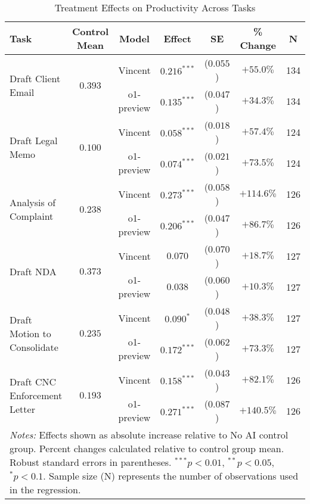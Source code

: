 \begin{table}[!htbp]
\centering
\caption{Treatment Effects on Productivity Across Tasks}
\label{tab:productivity_effects}
\begin{tabular}{lcccccc}
\hline\hline
Task & Control Mean & Model & Effect & SE & \% Change & N \\
\hline
\multirow{2}{*}{Draft Client Email} & \multirow{2}{*}{$0.393$} & Vincent & $0.216^{***}$ & ($0.055$) & $+55.0\%$ & 134 \\
& & o1-preview & $0.135^{***}$ & ($0.047$) & $+34.3\%$ & 134 \\
\hline
\multirow{2}{*}{Draft Legal Memo} & \multirow{2}{*}{$0.100$} & Vincent & $0.058^{***}$ & ($0.018$) & $+57.4\%$ & 124 \\
& & o1-preview & $0.074^{***}$ & ($0.021$) & $+73.5\%$ & 124 \\
\hline
\multirow{2}{*}{Analysis of Complaint} & \multirow{2}{*}{$0.238$} & Vincent & $0.273^{***}$ & ($0.058$) & $+114.6\%$ & 126 \\
& & o1-preview & $0.206^{***}$ & ($0.047$) & $+86.7\%$ & 126 \\
\hline
\multirow{2}{*}{Draft NDA} & \multirow{2}{*}{$0.373$} & Vincent & $0.070$ & ($0.070$) & $+18.7\%$ & 127 \\
& & o1-preview & $0.038$ & ($0.060$) & $+10.3\%$ & 127 \\
\hline
\multirow{2}{*}{Draft Motion to Consolidate} & \multirow{2}{*}{$0.235$} & Vincent & $0.090^{*}$ & ($0.048$) & $+38.3\%$ & 127 \\
& & o1-preview & $0.172^{***}$ & ($0.062$) & $+73.3\%$ & 127 \\
\hline
\multirow{2}{*}{Draft CNC Enforcement Letter} & \multirow{2}{*}{$0.193$} & Vincent & $0.158^{***}$ & ($0.043$) & $+82.1\%$ & 126 \\
& & o1-preview & $0.271^{***}$ & ($0.087$) & $+140.5\%$ & 126 \\
\hline
\multicolumn{7}{p{0.95\linewidth}}{\footnotesize \textit{Notes:} Effects shown as absolute increase relative to No AI control group. Percent changes calculated relative to control group mean. Robust standard errors in parentheses. $^{***}p<0.01$, $^{**}p<0.05$, $^{*}p<0.1$. Sample size (N) represents the number of observations used in the regression.}
\end{tabular}
\end{table}
